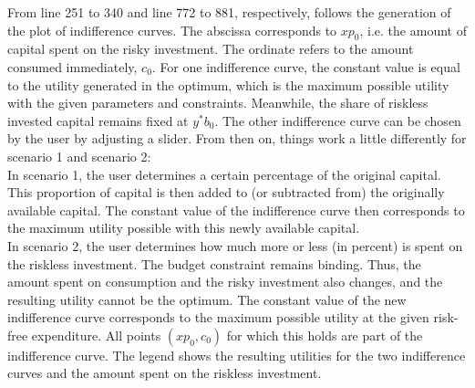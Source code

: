 \noindent From line 251 to 340 and line 772 to 881, respectively, follows the generation of the plot of indifference curves. The abscissa corresponds to $xp_0$, i.e. the amount of capital spent on the risky investment. The ordinate refers to the amount consumed immediately, $c_0$. For one indifference curve, the constant value is equal to the utility generated in the optimum, which is the maximum possible utility with the given parameters and constraints. Meanwhile, the share of riskless invested capital remains fixed at $y^*b_0$. The other indifference curve can be chosen by the user by adjusting a slider. From then on, things work a little differently for scenario 1 and scenario 2:\\
In scenario 1, the user determines a certain percentage of the original capital. This proportion of capital is then added to (or subtracted from) the originally available capital. The constant value of the indifference curve then corresponds to the maximum utility possible with this newly available capital.\\
In scenario 2, the user determines how much more or less (in percent) is spent on the riskless investment. The budget constraint remains binding. Thus, the amount spent on consumption and the risky investment also changes, and the resulting utility cannot be the optimum. The constant value of the new indifference curve corresponds to the maximum possible utility at the given risk-free expenditure. All points $(xp_0, c_0)$ for which this holds are part of the indifference curve. The legend shows the resulting utilities for the two indifference curves and the amount spent on the riskless investment.\\

